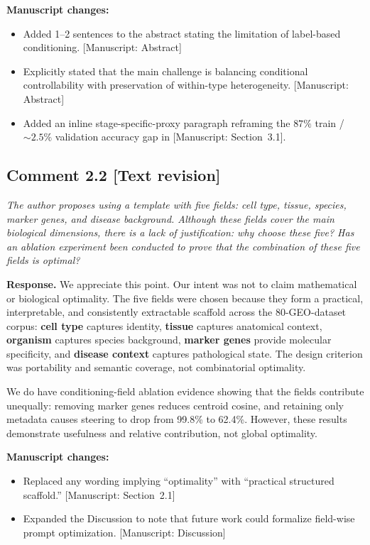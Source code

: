 \documentclass[11pt,letterpaper]{article}
\newcommand{\statustext}{\textcolor{statusblue}{\textbf{[Text revision]}}}
\newcommand{\msref}[1]{\textcolor{blue!60!black}{\textsf{[Manuscript: #1]}}}
\begin{document}
\noindent\textbf{Manuscript changes:}
\begin{itemize}
  \item Added 1--2 sentences to the abstract stating the limitation of label-based conditioning. \msref{Abstract}
  \item Explicitly stated that the main challenge is balancing conditional controllability with preservation of within-type heterogeneity. \msref{Abstract}
  \item Added an inline stage-specific-proxy paragraph reframing the $87\%$ train / $\sim\!2.5\%$ validation accuracy gap in \msref{Section~3.1}.
\end{itemize}

\medskip

\subsection*{Comment 2.2 \hfill \statustext}

\begin{reviewercomment}
\itshape
The author proposes using a template with five fields: cell type, tissue, species, marker genes, and disease background. Although these fields cover the main biological dimensions, there is a lack of justification: why choose these five? Has an ablation experiment been conducted to prove that the combination of these five fields is optimal?
\end{reviewercomment}

\noindent\textbf{Response.}
We appreciate this point. Our intent was not to claim mathematical or biological optimality. The five fields were chosen because they form a practical, interpretable, and consistently extractable scaffold across the 80-GEO-dataset corpus: \textbf{cell type} captures identity, \textbf{tissue} captures anatomical context, \textbf{organism} captures species background, \textbf{marker genes} provide molecular specificity, and \textbf{disease context} captures pathological state. The design criterion was portability and semantic coverage, not combinatorial optimality.

We do have conditioning-field ablation evidence showing that the fields contribute unequally: removing marker genes reduces centroid cosine, and retaining only metadata causes steering to drop from 99.8\% to 62.4\%. However, these results demonstrate usefulness and relative contribution, not global optimality.

\noindent\textbf{Manuscript changes:}
\begin{itemize}
  \item Replaced any wording implying ``optimality'' with ``practical structured scaffold.'' \msref{Section~2.1}
  \item Expanded the Discussion to note that future work could formalize field-wise prompt optimization. \msref{Discussion}
\end{itemize}
\end{document}
